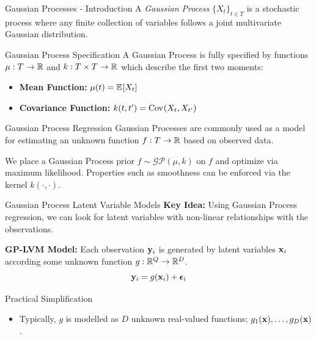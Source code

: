 \documentclass[dvipsnames]{beamer}
\newcommand{\GP}{\mathcal{GP}}
\begin{document}
\begin{frame}{Gaussian Processes - Introduction}
    A \emph{Gaussian Process} $\{X_{t}\}_{t \in T}$ is a stochastic process where any finite collection of variables follows a joint multivariate Gaussian distribution.

    \bigskip 

    \begin{block}{Gaussian Process Specification}
        A Gaussian Process is fully specified by functions $\mu: T \to \mathbb{R}$ and $k: T \times T \to \mathbb{R}$ which  describe the first two moments:
        \begin{itemize}
            \item \textbf{Mean Function:} $\mu(t) = \expec{X_t}$
            \item \textbf{Covariance Function:} $k(t, t') = \covar{X_{t}}{X_{t'}}$
        \end{itemize}
    \end{block}
\end{frame}

\begin{frame}{Gaussian Process Regression}
    Gaussian Processes are commonly used as a model for estimating an unknown function $f: T \to \mathbb{R}$ based on observed data. 

    We place a Gaussian Process prior $f \sim \GP(\mu, k)$ on $f$ and optimize via maximum likelihood. Properties such as smoothness can be enforced via the kernel $k(\cdot, \cdot)$. 
\end{frame}

\begin{frame}{Gaussian Process Latent Variable Models}
    \textbf{Key Idea:} Using Gaussian Process regression, we can look for latent variables with non-linear relationships with the observations.

    \bigskip

    \textbf{GP-LVM Model:} Each observation $\mathbf{y}_{i}$ is generated by latent variables $\mathbf{x}_{i}$ according some unknown function $g: \mathbb{R}^{Q} \to \mathbb{R}^{D}$.
    \begin{equation*}
        \mathbf{y}_{i} = g(\mathbf{x}_{i}) + \bm{\epsilon}_{i}
    \end{equation*}    

    \begin{alertblock}{Practical Simplification}
        \begin{itemize}[label=]
            \item Typically, $g$ is modelled as $D$ unknown real-valued  functions; $g_{1}(\mathbf{x}), \dots, g_{D}(\mathbf{x})$.
        \end{itemize}
    \end{alertblock}
\end{frame}
\end{document}
